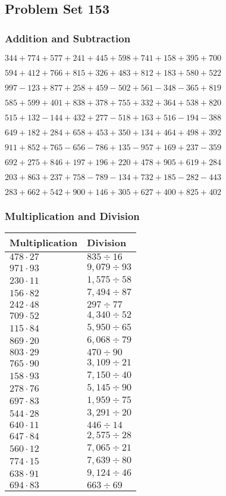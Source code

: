 \hypertarget{problem-set-153}{%
\subsection{Problem Set 153}\label{problem-set-153}}

\hypertarget{addition-and-subtraction}{%
\subsubsection{Addition and
Subtraction}\label{addition-and-subtraction}}

\(344 +774 +577 +241 +445 +598 +741 +158 +395 +700\)

\(594 +412 +766 +815 +326 +483 +812 +183 +580 +522\)

\(997 - 123 +877 +258 +459 - 502 +561 - 348 - 365 +819\)

\(585 +599 +401 +838 +378 +755 +332 +364 +538 +820\)

\(515 +132 - 144 +432 +277 - 518 +163 +516 - 194 - 388\)

\(649 +182 +284 +658 +453 +350 +134 +464 +498 +392\)

\(911 +852 +765 - 656 - 786 +135 - 957 +169 +237 - 359\)

\(692 +275 +846 +197 +196 +220 +478 +905 +619 +284\)

\(203 +863 +237 +758 - 789 - 134 +732 +185 - 282 - 443\)

\(283 +662 +542 +900 +146 +305 +627 +400 +825 +402\)

\hypertarget{multiplication-and-division}{%
\subsubsection{Multiplication and
Division}\label{multiplication-and-division}}

\begin{longtable}[]{@{}ll@{}}
\toprule
Multiplication & Division\tabularnewline
\midrule
\endhead
\(478 \cdot 27\) & \(835÷16\)\tabularnewline
\(971 \cdot 93\) & \(9,079÷93\)\tabularnewline
\(230 \cdot 11\) & \(1,575÷58\)\tabularnewline
\(156 \cdot 82\) & \(7,494÷87\)\tabularnewline
\(242 \cdot 48\) & \(297÷77\)\tabularnewline
\(709 \cdot 52\) & \(4,340÷52\)\tabularnewline
\(115 \cdot 84\) & \(5,950÷65\)\tabularnewline
\(869 \cdot 20\) & \(6,068÷79\)\tabularnewline
\(803 \cdot 29\) & \(470÷90\)\tabularnewline
\(765 \cdot 90\) & \(3,109÷21\)\tabularnewline
\(158 \cdot 93\) & \(7,150÷40\)\tabularnewline
\(278 \cdot 76\) & \(5,145÷90\)\tabularnewline
\(697 \cdot 83\) & \(1,959÷75\)\tabularnewline
\(544 \cdot 28\) & \(3,291÷20\)\tabularnewline
\(640 \cdot 11\) & \(446÷14\)\tabularnewline
\(647 \cdot 84\) & \(2,575÷28\)\tabularnewline
\(560 \cdot 12\) & \(7,065÷21\)\tabularnewline
\(774 \cdot 15\) & \(7,639÷80\)\tabularnewline
\(638 \cdot 91\) & \(9,124÷46\)\tabularnewline
\(694 \cdot 83\) & \(663÷69\)\tabularnewline
\bottomrule
\end{longtable}
